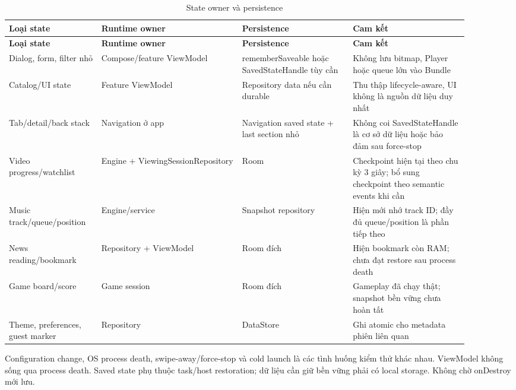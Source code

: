 \begingroup
\small
\renewcommand{\arraystretch}{1.2}
\setlength{\tabcolsep}{3pt}
\begin{longtable}{>{\RaggedRight\arraybackslash}p{0.17\linewidth}>{\RaggedRight\arraybackslash}p{0.28\linewidth}>{\RaggedRight\arraybackslash}p{0.22\linewidth}>{\RaggedRight\arraybackslash}p{0.23\linewidth}}
\caption{State owner và persistence}
\label{tab:state-storage}\\
\toprule
\textbf{Loại state} & \textbf{Runtime owner} & \textbf{Persistence} & \textbf{Cam kết} \\
\midrule
\endfirsthead
\toprule
\textbf{Loại state} & \textbf{Runtime owner} & \textbf{Persistence} & \textbf{Cam kết} \\
\midrule
\endhead
\bottomrule
\endfoot
Dialog, form, filter nhỏ & Compose/feature ViewModel & rememberSaveable hoặc SavedStateHandle tùy cần & Không lưu bitmap, Player hoặc queue lớn vào Bundle \\
Catalog/UI state & Feature ViewModel & Repository data nếu cần durable & Thu thập lifecycle-aware, UI không là nguồn dữ liệu duy nhất \\
Tab/detail/back stack & Navigation ở app & Navigation saved state + last section nhỏ & Không coi SavedStateHandle là cơ sở dữ liệu hoặc bảo đảm sau force-stop \\
Video progress/watchlist & Engine + ViewingSessionRepository & Room & Checkpoint hiện tại theo chu kỳ 3 giây; bổ sung checkpoint theo semantic events khi cần \\
Music track/queue/position & Engine/service & Snapshot repository & Hiện mới nhớ track ID; đầy đủ queue/position là phần tiếp theo \\
News reading/bookmark & Repository + ViewModel & Room đích & Hiện bookmark còn RAM; chưa đạt restore sau process death \\
Game board/score & Game session & Room đích & Gameplay đã chạy thật; snapshot bền vững chưa hoàn tất \\
Theme, preferences, guest marker & Repository & DataStore & Ghi atomic cho metadata phiên liên quan \\
\end{longtable}
\endgroup

Configuration change, OS process death, swipe-away/force-stop và cold launch là các tình huống kiểm thử khác nhau. ViewModel không sống qua process death. Saved state phụ thuộc task/host restoration; dữ liệu cần giữ bền vững phải có local storage. Không chờ onDestroy mới lưu.

